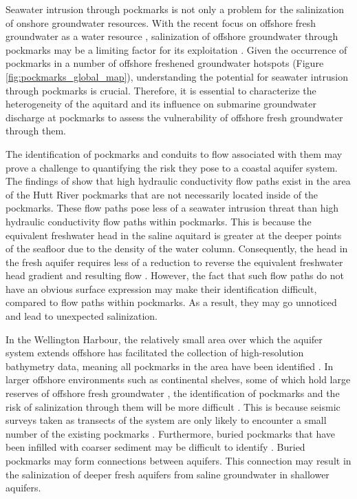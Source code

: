 \documentclass[draft, 10pt]{agujournal2019}
\begin{document}
Seawater intrusion through pockmarks is not only a problem for the salinization of onshore groundwater resources.
With the recent focus on offshore fresh groundwater as a water resource \cite{bakken_submarine_2012, zamrsky_offshore_2022},
salinization of offshore groundwater through pockmarks may be a limiting factor for its exploitation \cite{gyopari_wellington_2018}.
Given the occurrence of pockmarks in a number of offshore freshened groundwater hotspots (Figure \ref{fig:pockmarks_global_map}),
understanding the potential for seawater intrusion through pockmarks is crucial.
Therefore, it is essential to characterize the heterogeneity of the aquitard and its influence on submarine groundwater discharge at pockmarks to assess the vulnerability of offshore fresh groundwater through them.

The identification of pockmarks and conduits to flow associated with them may prove a challenge to quantifying the risk they pose to a coastal aquifer system.
The findings of  show that high hydraulic conductivity flow paths exist in the area of the Hutt River pockmarks that are not necessarily located inside of the pockmarks.
These flow paths pose less of a seawater intrusion threat than high hydraulic conductivity flow paths within pockmarks. This is because the
equivalent freshwater head in the saline aquitard is greater at the deeper points of the seafloor due to the density of the water column.
Consequently, the head in the fresh aquifer requires less of a reduction to reverse the equivalent freshwater head gradient and resulting flow \cite{post_variable_2022}.
However, the fact that such flow paths do not have an obvious surface expression may make their identification difficult, compared to flow paths within pockmarks. As a result,
they may go unnoticed and lead to unexpected salinization.

In the Wellington Harbour, the relatively small area over which the aquifer system extends offshore has facilitated the collection of high-resolution bathymetry data,
meaning all pockmarks in the area have been identified \cite{hoffmann_fresh_2023}. In larger offshore environments such as continental shelves,
some of which hold large reserves of offshore fresh groundwater \cite{zamrsky_offshore_2022}, the identification of pockmarks and the risk of salinization through them will be more difficult \cite{goff_modern_2019, gustafson_aquifer_2019}.
This is because seismic surveys taken as transects of the system are only likely to encounter a small number of the existing pockmarks \cite{bertoni_seismic_2020}.
Furthermore, buried pockmarks that have been infilled with coarser sediment may be difficult to identify  \cite{goff_modern_2019}.
Buried pockmarks may form connections between aquifers. This connection may result in the salinization of deeper fresh aquifers from saline groundwater in shallower aquifers.
\end{document}
